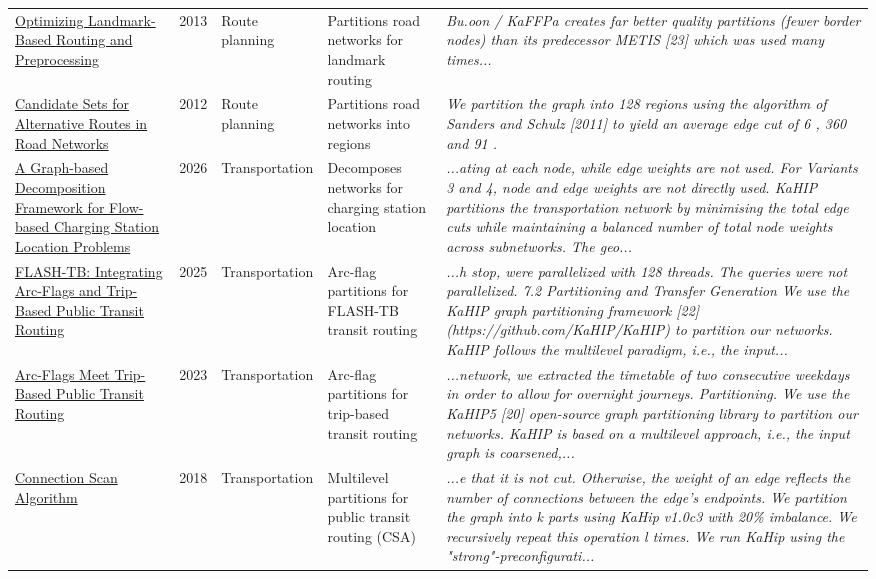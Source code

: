 \documentclass[9pt]{extarticle}
\begin{document}
\begin{longtable}{@{}>{\raggedright}p{6.6cm}r>{\raggedright}p{2.9cm}>{\raggedright}p{4.6cm}>{\raggedright\arraybackslash}p{8.4cm}@{}}
\href{https://doi.org/10.1145/2533828.2533838}{Optimizing Landmark-Based Routing and Preprocessing} & 2013 & Route planning & Partitions road networks for landmark routing & {\footnotesize\itshape Bu.oon / KaFFPa creates far better quality partitions (fewer border nodes) than its 
predecessor METIS [23] which was used many times...}\\
\href{https://doi.org/10.1145/2674395}{Candidate Sets for Alternative Routes in Road Networks} & 2012 & Route planning & Partitions road networks into regions & {\footnotesize\itshape We partition the graph into 128 regions using the algorithm of Sanders and Schulz [2011] to yield an average edge cut of 6 , 360 and 91 .}\\
\href{https://doi.org/10.21203/rs.3.rs-10321708/v1}{A Graph-based Decomposition Framework for Flow-based Charging Station Location Problems} & 2026 & Transportation & Decomposes networks for charging station location & {\footnotesize\itshape ...ating at each node, while edge weights are not used. For Variants 3 and 4, node and edge weights are not directly used. KaHIP partitions the transportation network by minimising the total edge cuts while maintaining a balanced number of total node weights across subnetworks. The geo...}\\
\href{https://doi.org/10.1287/trsc.2023.0481}{FLASH-TB: Integrating Arc-Flags and Trip-Based Public Transit Routing} & 2025 & Transportation & Arc-flag partitions for FLASH-TB transit routing & {\footnotesize\itshape ...h stop, were parallelized with 128 threads. The queries were not parallelized. 7.2 Partitioning and Transfer Generation We use the KaHIP graph partitioning framework [22] (https://github.com/KaHIP/KaHIP) to partition our networks. KaHIP follows the multilevel paradigm, i.e., the input...}\\
\href{https://doi.org/10.48550/arxiv.2302.07168}{Arc-Flags Meet Trip-Based Public Transit Routing} & 2023 & Transportation & Arc-flag partitions for trip-based transit routing & {\footnotesize\itshape ...network, we extracted the timetable of two consecutive weekdays in order to allow for overnight journeys. Partitioning. We use the KaHIP5 [20] open-source graph partitioning library to partition our networks. KaHIP is based on a multilevel approach, i.e., the input graph is coarsened,...}\\
\href{https://doi.org/10.1145/3274661}{Connection Scan Algorithm} & 2018 & Transportation & Multilevel partitions for public transit routing (CSA) & {\footnotesize\itshape ...e that it is not cut. Otherwise, the weight of an edge reflects the number of connections between the edge's endpoints. We partition the graph into k parts using KaHip v1.0c3 with 20\% imbalance. We recursively repeat this operation l times. We run KaHip using the "strong"-preconfigurati...}\\

\end{longtable}
\end{document}
